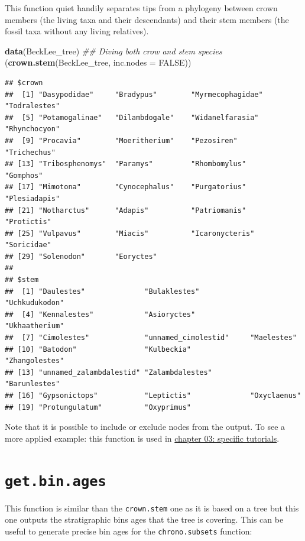 \documentclass[]{book}
\newenvironment{Shaded}{\begin{snugshade}}{\end{snugshade}}
\newcommand{\CommentTok}[1]{\textcolor[rgb]{0.56,0.35,0.01}{\textit{#1}}}
\newcommand{\DataTypeTok}[1]{\textcolor[rgb]{0.13,0.29,0.53}{#1}}
\newcommand{\KeywordTok}[1]{\textcolor[rgb]{0.13,0.29,0.53}{\textbf{#1}}}
\newcommand{\NormalTok}[1]{#1}
\newcommand{\OtherTok}[1]{\textcolor[rgb]{0.56,0.35,0.01}{#1}}
\begin{document}
This function quiet handily separates tips from a phylogeny between crown members (the living taxa and their descendants) and their stem members (the fossil taxa without any living relatives).

\begin{Shaded}
\begin{Highlighting}[]
\KeywordTok{data}\NormalTok{(BeckLee_tree)}
\CommentTok{## Diving both crow and stem species}
\NormalTok{(}\KeywordTok{crown.stem}\NormalTok{(BeckLee_tree, }\DataTypeTok{inc.nodes =} \OtherTok{FALSE}\NormalTok{))}
\end{Highlighting}
\end{Shaded}

\begin{verbatim}
## $crown
##  [1] "Dasypodidae"     "Bradypus"        "Myrmecophagidae" "Todralestes"    
##  [5] "Potamogalinae"   "Dilambdogale"    "Widanelfarasia"  "Rhynchocyon"    
##  [9] "Procavia"        "Moeritherium"    "Pezosiren"       "Trichechus"     
## [13] "Tribosphenomys"  "Paramys"         "Rhombomylus"     "Gomphos"        
## [17] "Mimotona"        "Cynocephalus"    "Purgatorius"     "Plesiadapis"    
## [21] "Notharctus"      "Adapis"          "Patriomanis"     "Protictis"      
## [25] "Vulpavus"        "Miacis"          "Icaronycteris"   "Soricidae"      
## [29] "Solenodon"       "Eoryctes"       
## 
## $stem
##  [1] "Daulestes"              "Bulaklestes"            "Uchkudukodon"          
##  [4] "Kennalestes"            "Asioryctes"             "Ukhaatherium"          
##  [7] "Cimolestes"             "unnamed_cimolestid"     "Maelestes"             
## [10] "Batodon"                "Kulbeckia"              "Zhangolestes"          
## [13] "unnamed_zalambdalestid" "Zalambdalestes"         "Barunlestes"           
## [16] "Gypsonictops"           "Leptictis"              "Oxyclaenus"            
## [19] "Protungulatum"          "Oxyprimus"
\end{verbatim}

Note that it is possible to include or exclude nodes from the output.
To see a more applied example: this function is used in \protect\hyperlink{custom-subsets}{chapter 03: specific tutorials}.

\hypertarget{get.bin.ages}{%
\section{\texorpdfstring{\texttt{get.bin.ages}}{get.bin.ages}}\label{get.bin.ages}}

This function is similar than the \texttt{crown.stem} one as it is based on a tree but this one outputs the stratigraphic bins ages that the tree is covering.
This can be useful to generate precise bin ages for the \texttt{chrono.subsets} function:
\end{document}
